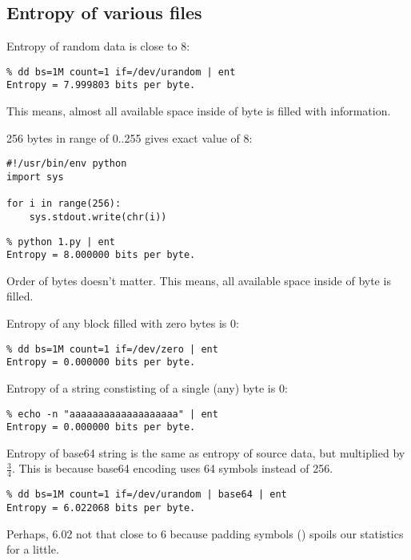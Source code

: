 \subsection{Entropy of various files}

Entropy of random data is close to 8:

\begin{lstlisting}
% dd bs=1M count=1 if=/dev/urandom | ent
Entropy = 7.999803 bits per byte.
\end{lstlisting}

This means, almost all available space inside of byte is filled with information.

256 bytes in range of 0..255 gives exact value of 8:

\begin{lstlisting}[style=custompy]
#!/usr/bin/env python
import sys

for i in range(256):
    sys.stdout.write(chr(i))
\end{lstlisting}

\begin{lstlisting}
% python 1.py | ent
Entropy = 8.000000 bits per byte.
\end{lstlisting}

Order of bytes doesn't matter.
This means, all available space inside of byte is filled.

Entropy of any block filled with zero bytes is 0:

\begin{lstlisting}
% dd bs=1M count=1 if=/dev/zero | ent
Entropy = 0.000000 bits per byte.
\end{lstlisting}

Entropy of a string constisting of a single (any) byte is 0:

\begin{lstlisting}
% echo -n "aaaaaaaaaaaaaaaaaaa" | ent
Entropy = 0.000000 bits per byte.
\end{lstlisting}

Entropy of base64 string is the same as entropy of source data, but multiplied by $\frac{3}{4}$.
This is because base64 encoding uses 64 symbols instead of 256.

\begin{lstlisting}
% dd bs=1M count=1 if=/dev/urandom | base64 | ent
Entropy = 6.022068 bits per byte.
\end{lstlisting}

Perhaps, 6.02 not that close to 6 because padding symbols (\TT{=}) spoils our statistics for a little.

